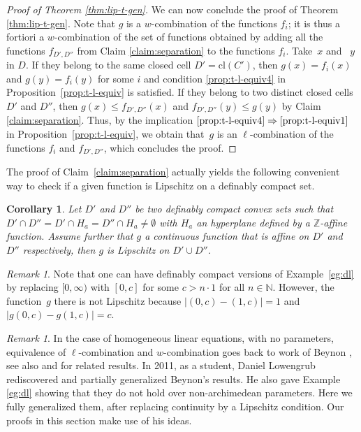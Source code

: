\documentclass[10pt]{amsart}
\newtheorem{coro}[subsection]{Corollary}
\theoremstyle{definition}
\theoremstyle{remark}
\newtheorem{rema}[subsection]{Remark}
\let\oldimplies\implies
\renewcommand\implies{\mathchoice{\oldimplies}{\Rightarrow}{\Rightarrow}{\Rightarrow}}
\newcommand{\cl}{\mathrm{cl}}
\newcommand{\N}{\mathbb N}
\newcommand{\Z}{\mathbb Z}
\theoremstyle{plain}
\theoremstyle{definition}
\begin{document}
\begin{proof}[Proof of Theorem \ref{thm:lip-t-gen}]
We can now conclude the proof of Theorem \ref{thm:lip-t-gen}. Note that $g$ is a $w$-combination of the functions $f_i$; it is thus a fortiori a $w$-combination of
the set of functions obtained by adding all the functions $f_{D',D''}$ from Claim \ref{claim:separation} to the functions $f_i$.
Take~$x$ and~ $y$ in $D$. If they belong to the same closed cell $D' = \cl(C')$, then $g (x) = f_i (x)$
and $g (y) = f_i (y)$ for some $i$ and condition \eqref{prop:t-l-equiv4} in Proposition~\ref{prop:t-l-equiv} is satisfied.
If they belong to two distinct closed cells $D'$ and $D''$,
then $g (x) \leq f_{D',D''} (x)$ and $ f_{D',D''} (y) \leq g (y)$ by Claim \ref{claim:separation}.
Thus, by the implication $\eqref{prop:t-l-equiv4}\implies\eqref{prop:t-l-equiv1}$ in
Proposition~\ref{prop:t-l-equiv}, we obtain that~$g$ is an $\ell$-combination of
the functions $f_i$ and $f_{D',D''}$, which concludes the proof.
\end{proof}
The proof of Claim~\ref{claim:separation} actually yields the following convenient way to check if a given function is Lipschitz on a definably compact set.

\begin{coro}
Let $D'$ and $D''$ be two definably compact convex sets such that $D'\cap D''=D'\cap H_a=D''\cap H_a\neq \emptyset$ with $H_a$ an hyperplane defined by a $\Z$-affine function. Assume further that $g$ a continuous function that is affine on $D'$ and $D''$ respectively, then $g$ is Lipschitz on $D'\cup D''$.
\end{coro}

\begin{rema}
Note that one can have definably compact versions of Example~\ref{eg:dl} by replacing $[0,\infty)$ with $[0,c]$ for some $c>n\cdot 1$ for all $n\in \N$. However, the function~$g$ there is not Lipschitz because $|(0,c)-(1,c)|=1$ and $|g(0,c)-g(1,c)|=c$.
\end{rema}

\begin{rema}In the case of homogeneous linear equations, with no parameters, equivalence of $\ell$-combination and $w$-combination goes back to work of Beynon \cite{beynon}, see also \cite[\S5.2]{glass} and \cite{Ovchinnikov} for related results. In 2011, as a student, Daniel Lowengrub rediscovered and partially generalized Beynon's results. He also gave Exam\-ple \ref{eg:dl} showing that they do not hold over non-archimedean parameters. Here we fully generalized them, after replacing continuity by a Lipschitz condition.
Our proofs in this section make use of his ideas.
\end{rema}
\end{document}
